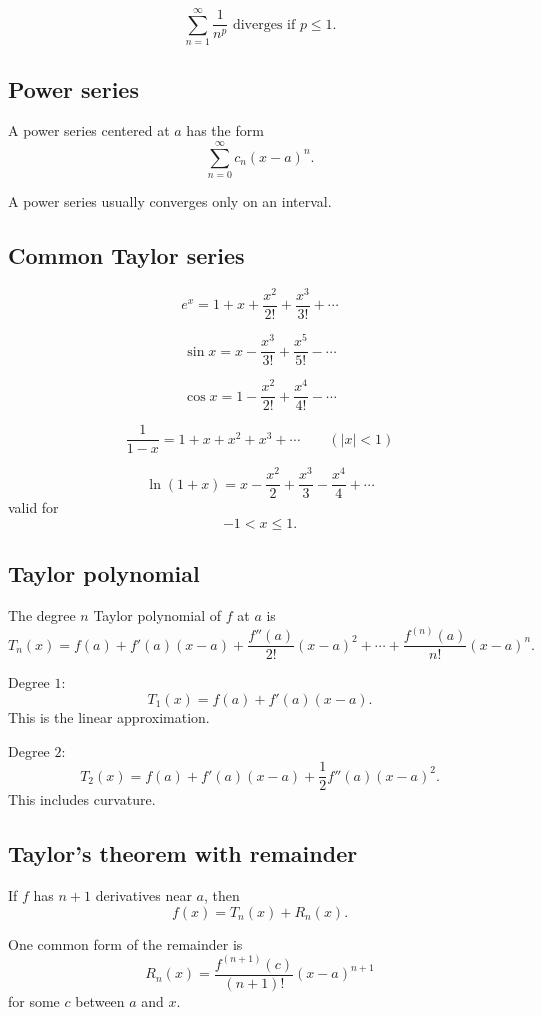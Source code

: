 \[
\boxed{
    \sum_{n=1}^{\infty}\frac1{n^p}
    \text{ diverges if }p\le1.
}
\]

\subsection*{Power series}

A power series centered at \(a\) has the form
\[
\boxed{
    \sum_{n=0}^{\infty}c_n(x-a)^n.
}
\]

A power series usually converges only on an interval.

\subsection*{Common Taylor series}

\[
\boxed{
    e^x
    =
    1+x+\frac{x^2}{2!}+\frac{x^3}{3!}+\cdots
}
\]

\[
\boxed{
    \sin x
    =
    x-\frac{x^3}{3!}+\frac{x^5}{5!}-\cdots
}
\]

\[
\boxed{
    \cos x
    =
    1-\frac{x^2}{2!}+\frac{x^4}{4!}-\cdots
}
\]

\[
\boxed{
    \frac1{1-x}
    =
    1+x+x^2+x^3+\cdots
    \qquad
    (|x|<1)
}
\]

\[
\boxed{
    \ln(1+x)
    =
    x-\frac{x^2}{2}+\frac{x^3}{3}-\frac{x^4}{4}+\cdots
}
\]
valid for
\[
    -1<x\le1.
\]

\subsection*{Taylor polynomial}

The degree \(n\) Taylor polynomial of \(f\) at \(a\) is
\[
\boxed{
    T_n(x)
    =
    f(a)
    +
    f'(a)(x-a)
    +
    \frac{f''(a)}{2!}(x-a)^2
    +
    \cdots
    +
    \frac{f^{(n)}(a)}{n!}(x-a)^n.
}
\]

Degree \(1\):
\[
\boxed{
    T_1(x)=f(a)+f'(a)(x-a).
}
\]
This is the linear approximation.

Degree \(2\):
\[
\boxed{
    T_2(x)=f(a)+f'(a)(x-a)+\frac12 f''(a)(x-a)^2.
}
\]
This includes curvature.

\subsection*{Taylor's theorem with remainder}

If \(f\) has \(n+1\) derivatives near \(a\), then
\[
\boxed{
    f(x)=T_n(x)+R_n(x).
}
\]

One common form of the remainder is
\[
\boxed{
    R_n(x)
    =
    \frac{f^{(n+1)}(c)}{(n+1)!}(x-a)^{n+1}
}
\]
for some \(c\) between \(a\) and \(x\).

